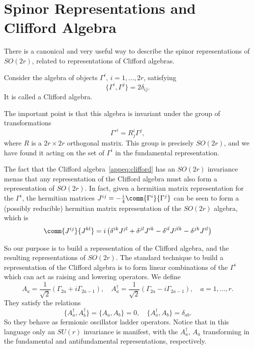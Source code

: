 \section{Spinor Representations and Clifford Algebra}
There is a canonical and very useful way to describe the spinor representations of $SO(2r)$, related to representations of Cliﬀord algebras.

Consider the algebra of objects $\Gamma^i$, $i = 1, \dots, 2r$, satisfying
\begin{equation}\label{appeq:clifford}
    \{\Gamma^i, \Gamma^j\} = 2 \delta_{ij}.
\end{equation}
It is called a Cliﬀord algebra.

The important point is that this algebra is invariant under the group of transformations
\begin{equation}
    \Gamma'^i = R^i_j \Gamma^j,
\end{equation}
where $R$ is a $2r\times2r$ orthogonal matrix. This group is precisely $SO(2r)$, and we have found it acting on the set of $\Gamma^i$ in the fundamental representation.

The fact that the Cliﬀord algebra~\eqref{appeq:clifford} has an $SO(2r)$ invariance menas that any representation of the Cliﬀord algebra must also form a representation of $SO(2r)$. In fact, given a hermitian matrix representation for the $\Gamma^i$, the hermitian matrices $J^{ij} = -\frac{i}{4}\comm{\Gamma^i}{\Gamma^j}$ can be seen to form a (possibly reducible) hermitian matrix representation of the $SO(2r)$ algebra, which is
\begin{equation}
    \comm{J^{ij}}{J^{kl}} = i \left( \delta^{ik} J^{jl} + \delta^{jl} J^{ik} - \delta^{il} J^{jlk} - \delta^{jk} J^{il} \right)
\end{equation}

So our purpose is to build a representation of the Cliﬀord algebra, and the resulting representations of $SO(2r)$. The standard technique to build a representation of the Cliﬀord algebra is to form linear combinations of the $\Gamma^i$ which can act as raising and lowering operators. We define
\begin{equation}
    A_a = \frac{1}{\sqrt{2}} (\Gamma_{2a}+i \Gamma_{2a-1}), \quad A^\dagger_a = \frac{1}{\sqrt{2}} (\Gamma_{2a}-i \Gamma_{2a-1}), \quad  a = 1, \dots, r .
\end{equation}
They satisfy the relations
\begin{equation}
    \{ A^\dagger_a, A^\dagger_b \} = \{ A_a, A_b \} = 0, \quad \{A^\dagger_a, A_b\} = \delta_{ab} .
\end{equation}
So they behave as fermionic oscillator ladder operators. Notice that in this language only an $SU(r)$ invariance is manifest, with the $A^\dagger_a$, $A_a$ transforming in the fundamental and antifundamental representations, respectively.

